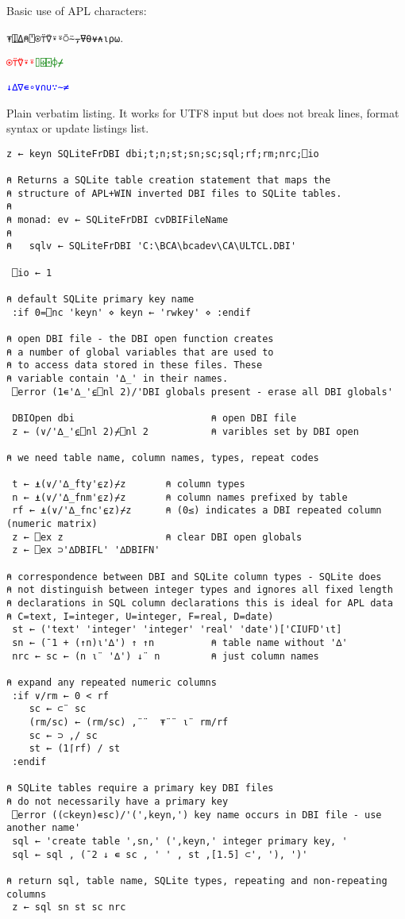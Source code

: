 \documentclass{article}
\begin{document}
Basic use of APL characters:

\Huge
\begin{description}
 \item  \texttt{⍕⍗⍙⍝⍞⍟⍡⍢⍣⍤⍥⍨⍪⍫⍬⍱⍲⍳⍴⍵}.
 \item  \textcolor{red}{\texttt{⍟⍡⍢⍣⍤}}\textcolor{green}{\texttt{⌷⌹⌻⌽⌿}}
 \item  \textcolor{blue}{\texttt{↓∆∇∊∘∨∩∪∵∼≠}}
\end{description}
\normalsize

Plain verbatim listing. It works for UTF8 input but does not break
lines, format syntax or update listings list.

\begin{verbatim}
z ← keyn SQLiteFrDBI dbi;t;n;st;sn;sc;sql;rf;rm;nrc;⎕io

⍝ Returns a SQLite table creation statement that maps the
⍝ structure of APL+WIN inverted DBI files to SQLite tables.
⍝
⍝ monad: ev ← SQLiteFrDBI cvDBIFileName
⍝
⍝   sqlv ← SQLiteFrDBI 'C:\BCA\bcadev\CA\ULTCL.DBI'

 ⎕io ← 1

⍝ default SQLite primary key name
 :if 0=⎕nc 'keyn' ⋄ keyn ← 'rwkey' ⋄ :endif

⍝ open DBI file - the DBI open function creates
⍝ a number of global variables that are used to
⍝ to access data stored in these files. These
⍝ variable contain '∆_' in their names.
 ⎕error (1∊'∆_'⍷⎕nl 2)/'DBI globals present - erase all DBI globals'

 DBIOpen dbi                        ⍝ open DBI file
 z ← (∨/'∆_'⍷⎕nl 2)⌿⎕nl 2           ⍝ varibles set by DBI open

⍝ we need table name, column names, types, repeat codes

 t ← ⍎(∨/'∆_fty'⍷z)⌿z       ⍝ column types
 n ← ⍎(∨/'∆_fnm'⍷z)⌿z       ⍝ column names prefixed by table
 rf ← ⍎(∨/'∆_fnc'⍷z)⌿z      ⍝ (0≤) indicates a DBI repeated column (numeric matrix)
 z ← ⎕ex z                  ⍝ clear DBI open globals
 z ← ⎕ex ⊃'∆DBIFL' '∆DBIFN'

⍝ correspondence between DBI and SQLite column types - SQLite does
⍝ not distinguish between integer types and ignores all fixed length
⍝ declarations in SQL column declarations this is ideal for APL data
⍝ C=text, I=integer, U=integer, F=real, D=date)
 st ← ('text' 'integer' 'integer' 'real' 'date')['CIUFD'⍳t]
 sn ← (¯1 + (↑n)⍳'∆') ↑ ↑n          ⍝ table name without '∆'
 nrc ← sc ← (n ⍳¨ '∆') ↓¨ n         ⍝ just column names

⍝ expand any repeated numeric columns
 :if ∨/rm ← 0 < rf
    sc ← ⊂¨ sc
    (rm/sc) ← (rm/sc) ,¨¨  ⍕¨¨ ⍳¨ rm/rf
    sc ← ⊃ ,/ sc
    st ← (1⌈rf) / st
 :endif

⍝ SQLite tables require a primary key DBI files
⍝ do not necessarily have a primary key
 ⎕error ((⊂keyn)∊sc)/'(',keyn,') key name occurs in DBI file - use another name'
 sql ← 'create table ',sn,' (',keyn,' integer primary key, '
 sql ← sql , (¯2 ↓ ∊ sc , ' ' , st ,[1.5] ⊂', '), ')'

⍝ return sql, table name, SQLite types, repeating and non-repeating columns
 z ← sql sn st sc nrc
\end{verbatim}
\end{document}
